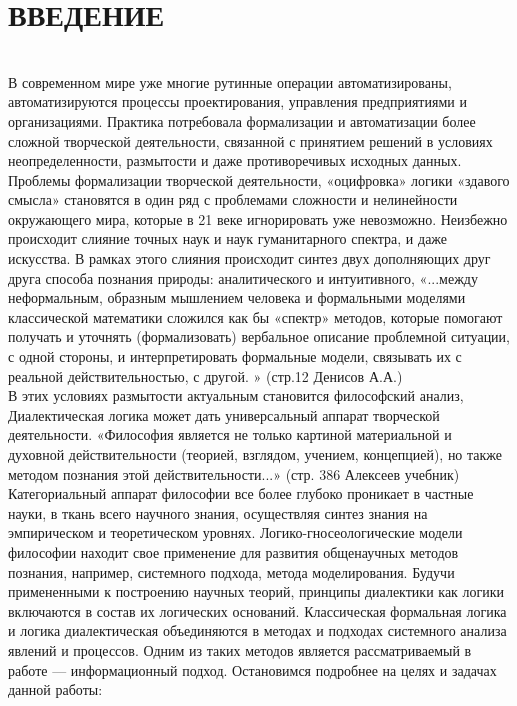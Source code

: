 \documentclass[a4paper,12pt]{report}
\begin{document}
\chapter*{ВВЕДЕНИЕ}
 \\
\pagestyle{plain} 
В современном мире уже многие рутинные операции автоматизированы, автоматизируются процессы проектирования, управления предприятиями и организациями. Практика потребовала формализации и автоматизации более сложной творческой деятельности, связанной с принятием решений в условиях неопределенности, размытости и даже противоречивых исходных данных.  Проблемы формализации творческой деятельности, «оцифровка» логики «здавого смысла» становятся в один ряд с проблемами сложности и нелинейности окружающего мира, которые в 21 веке игнорировать уже невозможно. Неизбежно происходит слияние точных наук и наук гуманитарного спектра, и даже искусства. В рамках этого слияния происходит синтез двух дополняющих друг друга способа познания природы: аналитического и интуитивного, «...между неформальным, образным мышлением человека и формальными моделями классической математики сложился как бы «спектр» методов, которые помогают получать и уточнять (формализовать) вербальное описание проблемной ситуации, с одной стороны, и интерпретировать формальные модели, связывать их с реальной действительностью, с другой. » (стр.12 Денисов А.А.) \\

В этих условиях размытости актуальным становится философский анализ, Диалектическая логика может дать универсальный аппарат творческой деятельности. «Философия является не только картиной материальной и духовной действительности (теорией, взглядом, учением, концепцией), но также методом познания этой действительности...»  (стр. 386 Алексеев учебник) Категориальный аппарат философии  все более глубоко проникает в частные науки, в ткань всего научного знания, осуществляя синтез знания на эмпирическом и теоретическом уровнях. Логико-гносеологические модели философии находит свое применение для развития общенаучных методов познания, например, системного подхода, метода моделирования. Будучи примененными к построению научных теорий, принципы диалектики как логики включаются в состав их логических оснований.
Классическая формальная логика и логика диалектическая объединяются в методах и подходах системного анализа явлений и процессов. Одним из таких методов является рассматриваемый в работе — информационный подход. Остановимся подробнее на целях и задачах данной работы:\\
\end{document}
